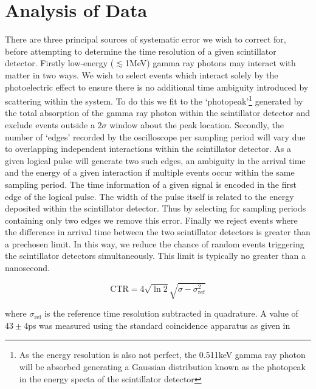 \section{Analysis of Data}
There are three principal sources of systematic error we wish to correct for, before attempting to determine the time resolution of a given scintillator detector. Firstly low-energy ($\lesssim$1MeV) gamma ray photons may interact with matter in two ways. We wish to select events which interact solely by the photoelectric effect to ensure there is no additional time ambiguity introduced by scattering within the system. To do this we fit to the `photopeak'\footnote{As the energy resolution is also not perfect, the 0.511keV gamma ray photon will be absorbed generating a Gaussian distribution known as the photopeak in the energy specta of the scintillator detector} generated by the total absorption of the gamma ray photon within the scintillator detector and exclude events outside a $2\sigma$ window about the peak location. Secondly, the number of `edges' recorded by the oscilloscope per sampling period will vary due to overlapping independent interactions within the scintillator detector. As a given logical pulse will generate two such edges, an ambiguity in the arrival time and the energy of a given interaction if multiple events occur within the same sampling period. The time information of a given signal is encoded in the first edge of the logical pulse. The width of the pulse itself is related to the energy deposited within the scintillator detector. Thus by selecting for sampling periods containing only two edges we remove this error. Finally we reject events where the difference in arrival time between the two scintillator detectors is greater than a prechosen limit. In this way, we reduce the chance of random events triggering the scintillator detectors simultaneously. This limit is typically no greater than a nanosecond.

$$
\text{CTR} = 4\sqrt{\ln{2}}\sqrt{\sigma-\sigma_\textrm{ref}^2}
$$

where $\sigma_\text{ref}$ is the reference time resolution subtracted in quadrature. A value of $43\pm4$ps was measured using the standard coincidence apparatus as given in \cite{ch_Meyer_Pizzichemi_Lecoq_2013}


